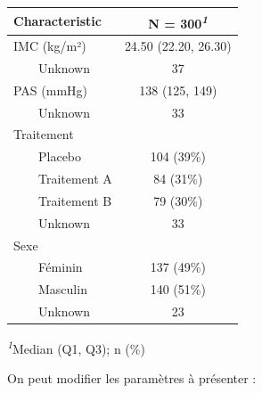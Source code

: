 \documentclass[
]{book}
\begin{document}
\begin{table}[t]
\fontsize{12.0pt}{14.0pt}\selectfont
\begin{tabular*}{\linewidth}{@{\extracolsep{\fill}}lc}
\toprule
\textbf{Characteristic} & \textbf{N = 300}\textsuperscript{\textit{1}} \\ 
\midrule\addlinespace[2.5pt]
IMC (kg/m²) & 24.50 (22.20, 26.30) \\ 
    Unknown & 37 \\ 
PAS (mmHg) & 138 (125, 149) \\ 
    Unknown & 33 \\ 
Traitement &  \\ 
    Placebo & 104 (39\%) \\ 
    Traitement A & 84 (31\%) \\ 
    Traitement B & 79 (30\%) \\ 
    Unknown & 33 \\ 
Sexe &  \\ 
    Féminin & 137 (49\%) \\ 
    Masculin & 140 (51\%) \\ 
    Unknown & 23 \\ 
\bottomrule
\end{tabular*}
\begin{minipage}{\linewidth}
\vspace{.05em}
\textsuperscript{\textit{1}}Median (Q1, Q3); n (\%)\\
\end{minipage}
\end{table}

On peut modifier les paramètres à présenter :
\end{document}
